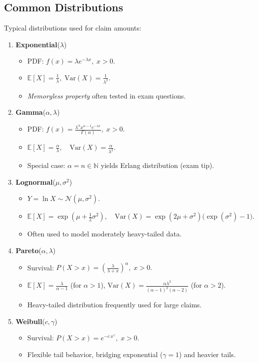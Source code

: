 \documentclass[13pt,a4paper]{article}
\begin{document}
\subsection{Common Distributions}
Typical distributions used for claim amounts:
\begin{enumerate}
  \item \textbf{Exponential}(\(\lambda\))
  \begin{itemize}
    \item PDF: \(f(x)=\lambda e^{-\lambda x}, \;x>0.\)
    \item \(\mathbb{E}[X] = \tfrac{1}{\lambda}, \;\mathrm{Var}(X) = \tfrac{1}{\lambda^2}.\)
    \item \emph{Memoryless property} often tested in exam questions.  
  \end{itemize}

  \item \textbf{Gamma}(\(\alpha,\lambda\))
  \begin{itemize}
    \item PDF: \(f(x)= \frac{\lambda^\alpha x^{\alpha-1}e^{-\lambda x}}{\Gamma(\alpha)},\; x>0.\)
    \item \(\mathbb{E}[X] = \frac{\alpha}{\lambda},\quad \mathrm{Var}(X) = \frac{\alpha}{\lambda^2}.\)
    \item Special case: \(\alpha=n \in \mathbb{N}\) yields Erlang distribution (exam tip).
  \end{itemize}

  \item \textbf{Lognormal}(\(\mu,\sigma^2\))
  \begin{itemize}
    \item \(Y=\ln X \sim \mathcal{N}(\mu,\sigma^2)\).
    \item \(\mathbb{E}[X]=\exp(\mu + \tfrac12\sigma^2),\quad \mathrm{Var}(X)=\exp(2\mu + \sigma^2)\bigl(\exp(\sigma^2)-1\bigr).\)
    \item Often used to model moderately heavy-tailed data.
  \end{itemize}

  \item \textbf{Pareto}(\(\alpha,\lambda\))
  \begin{itemize}
    \item Survival: \(P(X > x)= \left(\frac{\lambda}{\lambda + x}\right)^{\alpha}, \; x>0.\)
    \item \(\mathbb{E}[X]= \frac{\lambda}{\alpha-1}\) (for \(\alpha>1\)), \(\mathrm{Var}(X)=\frac{\alpha \lambda^2}{(\alpha-1)^2(\alpha-2)}\) (for \(\alpha>2\)).
    \item Heavy-tailed distribution frequently used for large claims.
  \end{itemize}

  \item \textbf{Weibull}(\(c,\gamma\))
  \begin{itemize}
    \item Survival: \(P(X> x)= e^{-c\,x^\gamma},\; x>0.\)
    \item Flexible tail behavior, bridging exponential (\(\gamma=1\)) and heavier tails.
  \end{itemize}

\end{enumerate}
\end{document}
